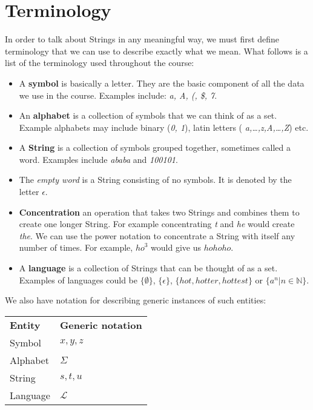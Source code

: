 
\section{Terminology}

In order to talk about Strings in any meaningful way, we must first define
terminology that we can use to describe exactly what we mean. What follows is a
list of the terminology used throughout the course:

\begin{itemize}
	\item A {\bf symbol} is basically a letter. They are the basic component of
	all the data we use in the course. Examples include: {\it a, A, (, \$, 7}.
	\item An {\bf alphabet} is a collection of symbols that we can think of as a
	set. Example alphabets may include binary ({\it 0, 1}), latin letters ({\it
	a,\dots,z,A,\dots,Z}) etc.
	\item A {\bf String} is a collection of symbols grouped together, sometimes
	called a word. Examples include {\it ababa} and {\it 100101}.
	\item The {\it empty word} is a String consisting of no symbols. It is
	denoted by the letter $\epsilon$.
	\item {\bf Concentration} an operation that takes two Strings and combines
	them to create one longer String. For example concentrating {\it t} and {\it
	he} would create {\it the}. We can use the power notation to concentrate a
	String with itself any number of times. For example, ${ho}^3$ would give us
	$hohoho$.
	\item A {\bf language} is a collection of Strings that can be thought of as
	a set. Examples of languages could be $\{\emptyset\}$, $\{\epsilon\}$,
	$\{hot,hotter,hottest\}$ or $\{a^n | n \in \mathbb{N}\}$.
\end{itemize}

We also have notation for describing generic instances of such entities:

\begin{center}
	\begin{tabular}{l l}
		{\bf Entity} & {\bf Generic notation}\\
		Symbol & $x, y, z$\\
		Alphabet & $\Sigma$\\
		String & $s, t, u$\\
		Language & $\mathcal{L}$\\
	\end{tabular}
\end{center}

